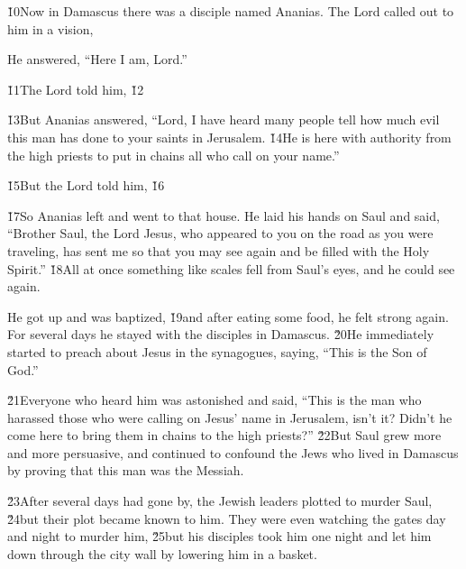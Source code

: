 \v{10}Now in Damascus there was a disciple named Ananias. The Lord called out to him in a vision, 

He answered, ``Here I am, Lord.''

\v{11}The Lord told him,  \v{12} 

\v{13}But Ananias answered, ``Lord, I have heard many people tell how much evil this man has done to your saints in Jerusalem. \v{14}He is here with authority from the high priests to put in chains all who call on your name.''

\v{15}But the Lord told him,  \v{16}

\v{17}So Ananias left and went to that house. He laid his hands on Saul and said, ``Brother Saul, the Lord Jesus, who appeared to you on the road as you were traveling, has sent me so that you may see again and be filled with the Holy Spirit.'' \v{18}All at once something like scales fell from Saul's eyes, and he could see again.

He got up and was baptized, \v{19}and after eating some food, he felt strong again. For several days he stayed with the disciples in Damascus. \v{20}He immediately started to preach about Jesus in the synagogues, saying, ``This is the Son of God.''

\v{21}Everyone who heard him was astonished and said, ``This is the man who harassed those who were calling on Jesus' name in Jerusalem, isn't it? Didn't he come here to bring them in chains to the high priests?'' \v{22}But Saul grew more and more persuasive, and continued to confound the Jews who lived in Damascus by proving that this man was the Messiah.

\v{23}After several days had gone by, the Jewish leaders plotted to murder Saul, \v{24}but their plot became known to him. They were even watching the gates day and night to murder him, \v{25}but his disciples took him one night and let him down through the city wall by lowering him in a basket.

